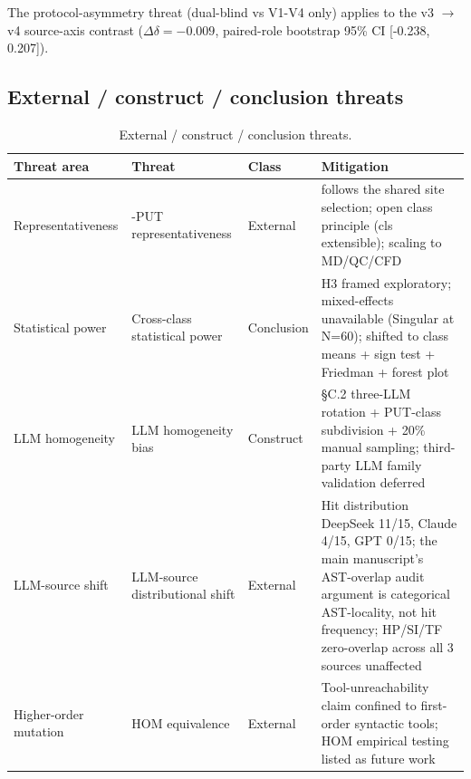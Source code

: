 \documentclass[manuscript,screen,review]{acmart}
\begin{document}
The protocol-asymmetry threat (dual-blind vs V1-V4 only) applies to the
v3 $\to$ v4 source-axis contrast ($\Delta\delta = -0.009$, paired-role
bootstrap 95\% CI [-0.238, 0.207]).

\subsection{External / construct / conclusion threats}\label{f.2-external-construct-conclusion-threats}

{%
\begin{longtable}[]{@{}
  >{\raggedright\arraybackslash}p{}
  >{\raggedright\arraybackslash}p{}
  >{\raggedright\arraybackslash}p{}
  >{\raggedright\arraybackslash}p{}@{}}
\caption{External / construct / conclusion threats.}\label{tab:p2-28}\\
\toprule\noalign{}
\begin{minipage}[b]{\linewidth}\raggedright
Threat area
\end{minipage} & \begin{minipage}[b]{\linewidth}\raggedright
Threat
\end{minipage} & \begin{minipage}[b]{\linewidth}\raggedright
Class
\end{minipage} & \begin{minipage}[b]{\linewidth}\raggedright
Mitigation
\end{minipage} \\
\midrule\noalign{}
\endfirsthead
\endhead
\bottomrule\noalign{}
\endlastfoot
Representativeness & 12-PUT representativeness & External & follows the shared site selection;
open class principle (cls extensible); scaling to MD/QC/CFD \\
Statistical power & Cross-class statistical power & Conclusion & H3 framed exploratory;
mixed-effects unavailable (Singular at N=60); shifted to class means +
sign test + Friedman + forest plot \\
LLM homogeneity & LLM homogeneity bias & Construct & §C.2 three-LLM rotation +
PUT-class subdivision + 20\% manual sampling; third-party LLM family
validation deferred \\
LLM-source shift & LLM-source distributional shift & External & Hit distribution
DeepSeek 11/15, Claude 4/15, GPT 0/15; the main manuscript's AST-overlap audit argument is categorical
AST-locality, not hit frequency; HP/SI/TF zero-overlap across all 3
sources unaffected \\
Higher-order mutation & HOM equivalence & External & Tool-unreachability claim confined to
first-order syntactic tools; HOM empirical testing listed as future
work \\
\end{longtable}
}
\end{document}

